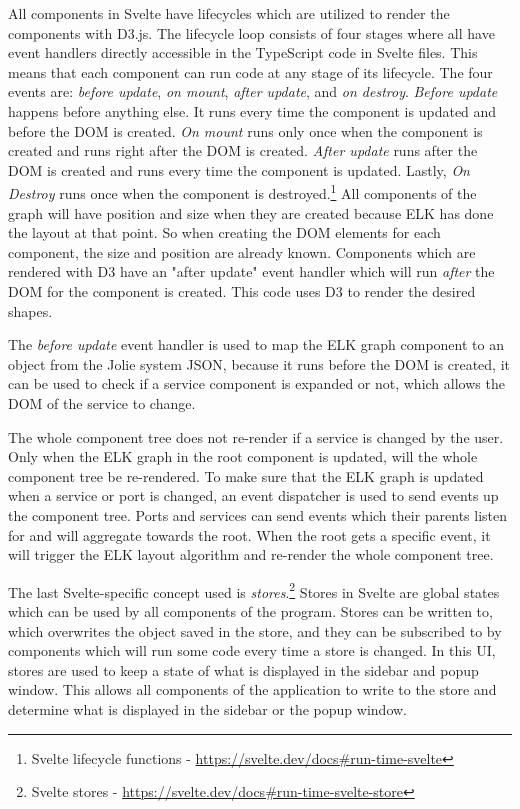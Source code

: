 All components in Svelte have lifecycles which are utilized to render the components with D3.js.
The lifecycle loop consists of four stages where all have event handlers directly accessible in the TypeScript code in Svelte files. This means that each component can run code at any stage of its lifecycle.
The four events are: \emph{before update}, \emph{on mount}, \emph{after update}, and \emph{on destroy}.
\emph{Before update} happens before anything else. It runs every time the component is updated and before the DOM is created.
\emph{On mount} runs only once when the component is created and runs right after the DOM is created. 
\emph{After update} runs after the DOM is created and runs every time the component is updated.
Lastly, \emph{On Destroy} runs once when the component is destroyed.\footnote{Svelte lifecycle functions - \url{https://svelte.dev/docs\#run-time-svelte}}
All components of the graph will have position and size when they are created because ELK has done the layout at that point.
So when creating the DOM elements for each component, the size and position are already known.
Components which are rendered with D3 have an "after update" event handler which will run \emph{after} the DOM for the component is created. This code uses D3 to render the desired shapes.

The \emph{before update} event handler is used to map the ELK graph component to an object from the Jolie system JSON, because it runs before the DOM is created, it can be used to check if a service component is expanded or not, which allows the DOM of the service to change.

The whole component tree does not re-render if a service is changed by the user. Only when the ELK graph in the root component is updated, will the whole component tree be re-rendered. To make sure that the ELK graph is updated when a service or port is changed, an event dispatcher is used to 
send events up the component tree. Ports and services can send events which their parents listen for and will aggregate towards the root. When the root gets a specific event, it will trigger the ELK layout algorithm and re-render the whole component tree.

The last Svelte-specific concept used is \emph{stores}.\footnote{Svelte stores - \url{https://svelte.dev/docs\#run-time-svelte-store}} Stores in Svelte are global states which can be used by all components of the program. Stores can be written to, which overwrites the object saved in the store, and they can be subscribed to by components which will run some code every time a store is changed.
In this UI, stores are used to keep a state of what is displayed in the sidebar and popup window. This allows all components of the application to write to the store and determine what is displayed in the sidebar or the popup window. 


